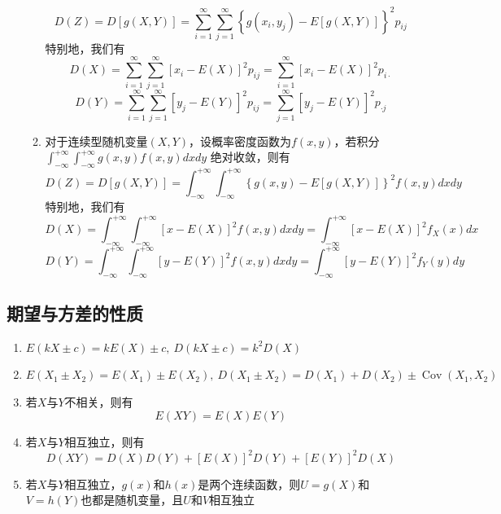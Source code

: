 \documentclass[12pt,a4paper,UTF8]{book}
\begin{document}
\begin{enumerate}
\begin{enumerate}
\[D\left(Z\right)=D\left[g\left(X,Y\right)\right]=\sum\limits_{i=1}^{\infty}\sum\limits_{j=1}^{\infty}\left\{g\left(x_i,y_j\right)-E\left[g\left(X,Y\right)\right]\right\}^2p_{ij}\]
特别地，我们有
\[D\left(X\right)=\sum\limits_{i=1}^{\infty}\sum\limits_{j=1}^{\infty}\left[x_i-E\left(X\right)\right]^2p_{ij}=\sum\limits_{i=1}^{\infty}\left[x_i-E\left(X\right)\right]^2p_{i\cdot}\]
\[D\left(Y\right)=\sum\limits_{i=1}^{\infty}\sum\limits_{j=1}^{\infty}\left[y_j-E\left(Y\right)\right]^2p_{ij}=\sum\limits_{j=1}^{\infty}\left[y_j-E\left(Y\right)\right]^2p_{\cdot j}\]
\item 对于连续型随机变量$\left(X,Y\right)$，设概率密度函数为$f\left(x,y\right)$，若积分$\int_{-\infty}^{+\infty}\int_{-\infty}^{+\infty}g\left(x,y\right)f\left(x,y\right)dxdy$ 绝对收敛，则有
\[D\left(Z\right)=D\left[g\left(X,Y\right)\right]=\int_{-\infty}^{+\infty}\int_{-\infty}^{+\infty}\left\{g\left(x,y\right)-E\left[g\left(X,Y\right)\right]\right\}^2f\left(x,y\right)dxdy\]
特别地，我们有
\[D\left(X\right)=\int_{-\infty}^{+\infty}\int_{-\infty}^{+\infty}\left[x-E\left(X\right)\right]^2f\left(x,y\right)dxdy=\int_{-\infty}^{+\infty}\left[x-E\left(X\right)\right]^2f_X\left(x\right)dx\]
\[D\left(Y\right)=\int_{-\infty}^{+\infty}\int_{-\infty}^{+\infty}\left[y-E\left(Y\right)\right]^2f\left(x,y\right)dxdy=\int_{-\infty}^{+\infty}\left[y-E\left(Y\right)\right]^2f_Y\left(y\right)dy\]
\end{enumerate}
\end{enumerate}

\subsection{期望与方差的性质}
\begin{enumerate}
\item $E\left(kX\pm c\right)=kE\left(X\right)\pm c,\ D\left(kX\pm c\right)=k^2D\left(X\right)$
\item $E\left(X_1\pm X_2\right)=E\left(X_1\right)\pm E\left(X_2\right),\ D\left(X_1\pm X_2\right)=D\left(X_1\right)+D\left(X_2\right)\pm\operatorname{Cov}\left(X_1,X_2\right)$
\item 若$X$与$Y$不相关，则有
\[E\left(XY\right)=E\left(X\right)E\left(Y\right)\]
\item 若$X$与$Y$相互独立，则有
\[D\left(XY\right)=D\left(X\right)D\left(Y\right)+\left[E\left(X\right)\right]^2D\left(Y\right)+\left[E\left(Y\right)\right]^2D\left(X\right)\]
\item 若$X$与$Y$相互独立，$g\left(x\right)$和$h\left(x\right)$是两个连续函数，则$U=g\left(X\right)$和$V=h\left(Y\right)$也都是随机变量，且$U$和$V$相互独立
\end{enumerate}
\end{document}
